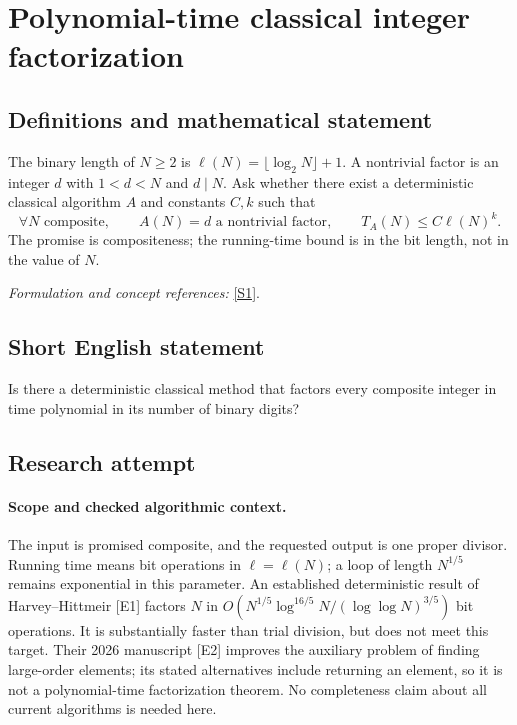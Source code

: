 \documentclass[11pt]{article}
\begin{document}
\section*{\texorpdfstring{Polynomial-time classical integer factorization}{Polynomial-time classical integer factorization}}\label{17}
\subsection{Definitions and mathematical statement}
The binary length of $N\ge2$ is $\ell(N)=\lfloor\log_2N\rfloor+1$. A nontrivial factor is an integer $d$ with $1<d<N$ and $d\mid N$. Ask whether there exist a deterministic classical algorithm $A$ and constants $C,k$ such that
\[
 \forall N\text{ composite},\qquad A(N)=d\text{ a nontrivial factor},\qquad
 T_A(N)\le C\ell(N)^k.
\]
The promise is compositeness; the running-time bound is in the bit length, not in the value of $N$.
\par\smallskip\textit{Formulation and concept references:} \href{https://www.sciencedirect.com/science/article/pii/S0022000015000768}{[S1]}.

\subsection{Short English statement}
Is there a deterministic classical method that factors every composite integer in time polynomial in its number of binary digits?
\subsection{Research attempt}

\paragraph{Scope and checked algorithmic context.}
The input is promised composite, and the requested output is one proper
divisor. Running time means bit operations in $\ell=\ell(N)$; a loop of
length $N^{1/5}$ remains exponential in this parameter. An established
deterministic result of Harvey--Hittmeir [E1] factors $N$ in
$O(N^{1/5}\log^{16/5}N/(\log\log N)^{3/5})$ bit operations. It is
substantially faster than trial division, but does not meet this target.
Their 2026 manuscript [E2] improves the auxiliary problem of finding
large-order elements; its stated alternatives include returning an element,
so it is not a polynomial-time factorization theorem. No completeness
claim about all current algorithms is needed here.
\end{document}
